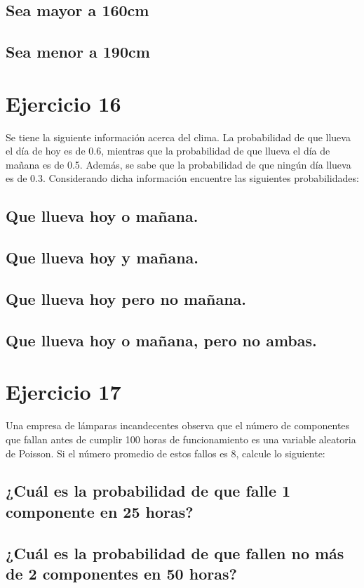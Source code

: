 \documentclass[12pt]{article}
\begin{document}
\subsection{Sea mayor a 160cm}
\subsection{Sea menor a 190cm}
\section{Ejercicio 16}
Se tiene la siguiente información acerca del clima. La probabilidad de que llueva el día de hoy
es de 0.6, mientras que la probabilidad de que llueva el día de mañana es de 0.5. Además, se
sabe que la probabilidad de que ningún día llueva es de 0.3. Considerando dicha información
encuentre las siguientes probabilidades:
\subsection{Que llueva hoy o mañana.}
\subsection{Que llueva hoy y mañana.}
\subsection{Que llueva hoy pero no mañana.}
\subsection{Que llueva hoy o mañana, pero no ambas.}
\section{Ejercicio 17}
Una empresa de lámparas incandecentes observa que el número de componentes que fallan
antes de cumplir 100 horas de funcionamiento es una variable aleatoria de Poisson. Si el
número promedio de estos fallos es 8, calcule lo siguiente:
\subsection{¿Cuál es la probabilidad de que falle 1 componente en 25 horas?}
\subsection{¿Cuál es la probabilidad de que fallen no más de 2 componentes en 50 horas?}
\end{document}
